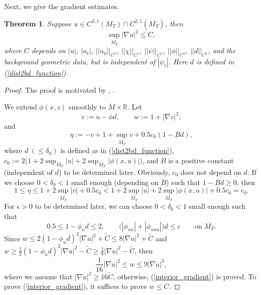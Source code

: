 \documentclass[12pt]{amsart}
\newtheorem{theorem}{Theorem}[section]
\theoremstyle{definition}
\theoremstyle{remark}
\numberwithin{equation}{section}
\begin{document}
Next, we give the gradient estimates.



\begin{theorem}\label{grad_estimate}
	Suppose $u\in C^{3, 1}(M_T) \cap C^{2,1}(\overline{M_T})$, then 
	\begin{equation}\label{interior_gradient}
	\sup_{\overline{M_T}} |\nabla u|^2 \leq C,
	\end{equation}
	where $C$ depends on $|u|$, $|u_t|$, $||u_0||_{C^1}$, $||\chi||_{C^1}$, $||\psi||_{C^1}$, $||\phi||_{C^3}$, $||d||_{C^3}$, and the background geometric data, but is independent of $|\psi_t|$.
	Here $d$ is defined in (\ref{dist2bd_function}).
\end{theorem}



\begin{proof}
	The proof is motivated by \cite{Guan18}, \cite{GuanXiang18}.
	
	We extend $\phi(x, z)$ smoothly to $\overline{M} \times \mathbb{R}$.
	Let $$v := u - \phi d, \qquad w := 1 + |\nabla v|^2,$$ 
	and 
	\begin{equation}
	\eta := -v + 1 + \sup_{\overline{M_T}} v + 0.5 c_0(1 - Bd),
	\end{equation}
	where $d \;(\leq \delta_0)$ is defined as in (\ref{dist2bd_function}), $c_0 := 2\big(1 + 2 \sup_{\overline{M_T}}|u| + 2\sup_{\overline{M_T}}|\phi(x, u)| \big)$, and $B$ is a positive constant (independent of $d$) to be determined later. 
	Obviously, $c_0$ does not depend on $d$. 
	If we choose $0<\delta_0<1$ small enough (depending on $B$) such that $1 - Bd \geq 0$, then
	\begin{equation}
	1 \leq \eta \leq  1 + 2 \sup_{\overline{M_T}}|v| +  0.5 c_0 < 1 + 2 \sup_{\overline{M_T}}|u| + 2\sup_{\overline{M_T}}|\phi(x, u)| +  0.5 c_0 = c_0.
	\end{equation}
	For $\epsilon > 0$ to be determined later, we can choose $0<\delta_0<1$ small enough such that 
	\begin{equation}\label{C1_delta_0_constraint}
	0.5 \leq 1 - \phi_u d \leq 2, \qquad \big( |\phi_{uu}| + |\phi_{uuu}| \big) d \leq \epsilon \qquad \text{on}\; \overline{M_T}.
	\end{equation}
	Since $w \leq 2(1 - \phi_u d)^2 |\nabla u|^2 + \tilde{C} \leq 8 |\nabla u|^2 + \tilde{C}$ and $w \geq \frac{1}{2} (1 - \phi_u d)^2 |\nabla u|^2 - \tilde{C} \geq \frac{1}{8} |\nabla u|^2 - \tilde{C}$, then
	\begin{equation}\label{C1_w_gra_u}
	\frac{1}{16}|\nabla u|^2 \leq w \leq 9|\nabla u|^2,
	\end{equation}
	where we assume that $|\nabla u|^2 \geq 16\tilde{C}$, otherwise, (\ref{interior_gradient}) is proved. To prove (\ref{interior_gradient}), it suffices to prove $w \leq C$.
	

\end{proof}
\end{document}
